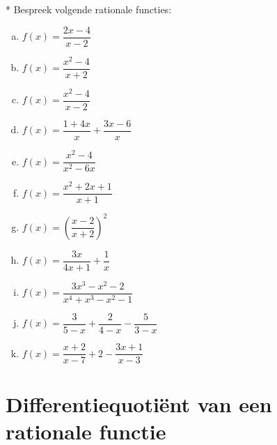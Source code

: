 \documentclass[12pt]{article}
\begin{document}
\begin{oefening}*
Bespreek volgende rationale functies:
\begin{multicols}{2}
\begin{enumerate}[(a)]
  \itemsep1em
  \item $f(x)=\dfrac{2x-4}{x-2}$
  \item $f(x)=\dfrac{x^2-4}{x+2}$
  \item $f(x)=\dfrac{x^2-4}{x-2}$
  \item $f(x)=\dfrac{1+4x}{x}+\dfrac{3x-6}{x}$
  \item $f(x)=\dfrac{x^2-4}{x^2-6x}$
  \item $f(x)=\dfrac{x^2+2x+1}{x+1}$
  \item $f(x)=\left(\dfrac{x-2}{x+2}\right)^2$
  \item $f(x)=\dfrac{3x}{4x+1}+\dfrac{1}{x}$
  \item $f(x)=\dfrac{3x^3-x^2-2}{x^4+x^3-x^2-1}$
  \item $f(x)=\dfrac{3}{5-x}+\dfrac{2}{4-x}-\dfrac{5}{3-x}$
  \item $f(x)=\dfrac{x+2}{x-7}+2-\dfrac{3x+1}{x-3}$
\end{enumerate}
\end{multicols}
\end{oefening}

\pagebreak
\section{Differentiequotiënt van een rationale functie}
\end{document}

